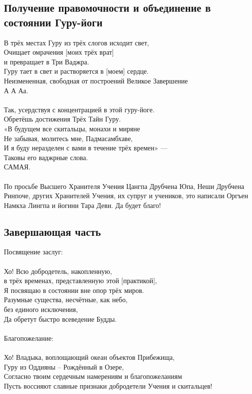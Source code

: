 \subsection*{Получение правомочности и объединение в состоянии Гуру-йоги}
В трёх местах Гуру из трёх слогов исходит свет,\\
Очищает омрачения [моих трёх врат] \\ \indent и превращает в Три Ваджра.\\
Гуру тает в свет и растворяется в [моем] сердце.\\
Неизмененная, свободная от построений Великое Завершение\\
\indent А А Аа.\\
\\
\scriptsize
Так, усердствуя с концентрацией в этой гуру-йоге.\\
Обретёшь достижения Трёх Тайн Гуру.\\
«В будущем все скитальцы, монахи и миряне\\
Не забывая, молитесь мне, Падмасамбхаве,\\
И я буду неразделен с вами в течение трёх времен» —\\
Таковы его ваджрные слова.\\
САМАЯ.\\
\\
По просьбе Высшего Хранителя Учения Цангпа Друбчена Юпа,
Неши Друбчена Ринпоче, других Хранителей Учения, их супруг и учеников,
это написали Оргъен Намкха Лингпа и йогини Тара Деви. Да будет благо!
\normalsize

\subsection{Завершающая часть}

\scriptsize
Посвящение заслуг:\\
\normalsize
\\
Хо! Всю добродетель, накопленную, \\
\indent в трёх временах, представленную этой [практикой],\\
Я посвящаю в состоянии вне опор трёх миров.\\
Разумные существа, несчётные, как небо, \\
\indent без единого исключения,\\
Да обретут быстро всеведение Будды.\\
\\

\scriptsize
Благопожелание:\\
\normalsize
\\
Хо! Владыка, воплощающий океан объектов Прибежища,\\
Гуру из Оддияны – Рождённый в Озере,\\
Согласно твоим сердечным намерениям и благопожеланиям\\
Пусть воссияют славные признаки добродетели Учения и скитальцев!\\

